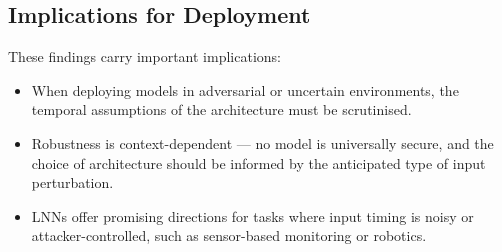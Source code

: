 \subsection*{Implications for Deployment}

These findings carry important implications:
\begin{itemize}
    \item When deploying models in adversarial or uncertain environments, the temporal assumptions of the architecture must be scrutinised.
    \item Robustness is context-dependent — no model is universally secure, and the choice of architecture should be informed by the anticipated type of input perturbation.
    \item LNNs offer promising directions for tasks where input timing is noisy or attacker-controlled, such as sensor-based monitoring or robotics.
\end{itemize}
